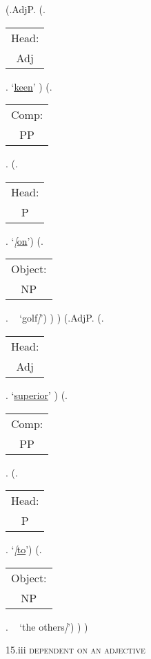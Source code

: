 \documentclass[12pt,letterpaper]{article}
\begin{document}
\begin{figure}
	\begin{center}
		\begin{parsetree}
			
			(.AdjP.
			(.\begin{tabular}{c}Head:\\Adj\end{tabular}. `\underline{\underline{keen}}' )
			(.\begin{tabular}{c}Comp:\\PP\end{tabular}. 
			(.\begin{tabular}{c}Head:\\P\end{tabular}.  `\emph{[}\underline{on}')
			(.\begin{tabular}{c}Object:\\NP\end{tabular}. ~ `golf\emph{]}')
			)
			)
			(.AdjP.
			(.\begin{tabular}{c}Head:\\Adj\end{tabular}. `\underline{\underline{superior}}' )
			(.\begin{tabular}{c}Comp:\\PP\end{tabular}. 
			(.\begin{tabular}{c}Head:\\P\end{tabular}.  `\emph{[}\underline{to}')
			(.\begin{tabular}{c}Object:\\NP\end{tabular}. ~ `the others\emph{]}')
			)
			)
			
			\hfill \break\hfill \break
		\end{parsetree}
		15.iii \textsc{dependent on an adjective}
	\end{center}
\end{figure}
\end{document}
